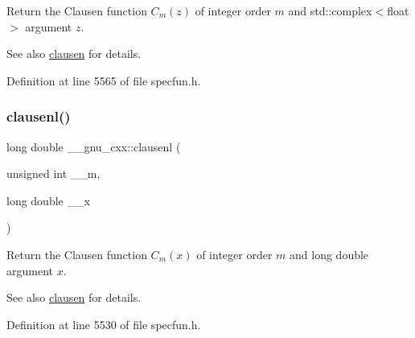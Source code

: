 Return the Clausen function $ C_m(z) $ of integer order $ m $ and {\ttfamily std\+::complex$<$float$>$} argument $ z $.

\begin{DoxySeeAlso}{See also}
\hyperlink{group__gnu__math__spec__func_ga54e4ba71b1f81718d6998349f91ff88f}{clausen} for details. 
\end{DoxySeeAlso}


Definition at line 5565 of file specfun.\+h.

\mbox{\label{group__gnu__math__spec__func_ga33132bab39c8d78dde807b45fc06de52}} 
\subsubsection{\texorpdfstring{clausenl()}{clausenl()}\hspace{0.1cm}{\footnotesize\ttfamily [1/2]}}
{\footnotesize\ttfamily long double \+\_\+\+\_\+gnu\+\_\+cxx\+::clausenl (\begin{DoxyParamCaption}\item[{unsigned int}]{\+\_\+\+\_\+m,  }\item[{long double}]{\+\_\+\+\_\+x }\end{DoxyParamCaption})\hspace{0.3cm}{\ttfamily [inline]}}

Return the Clausen function $ C_m(x) $ of integer order $ m $ and {\ttfamily long double} argument $ x $.

\begin{DoxySeeAlso}{See also}
\hyperlink{group__gnu__math__spec__func_ga54e4ba71b1f81718d6998349f91ff88f}{clausen} for details. 
\end{DoxySeeAlso}


Definition at line 5530 of file specfun.\+h.

\mbox{\label{group__gnu__math__spec__func_gae39368808280f5c1b80dce7c2f4a67a7}} 
